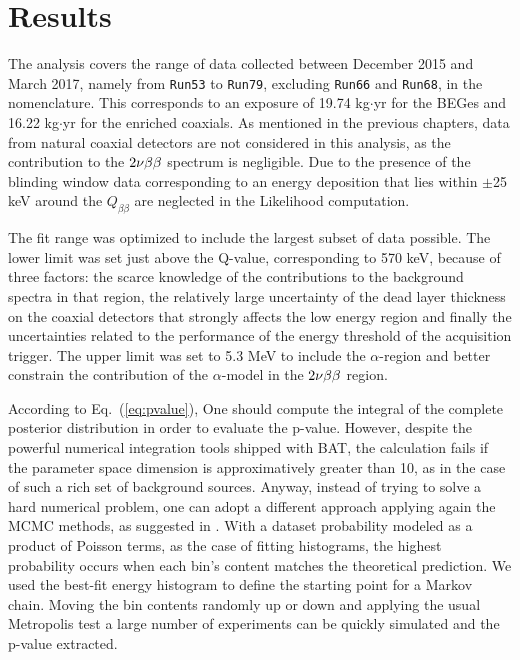 \section{Results}\label{sec:results}
The analysis covers the range of data collected between December 2015 and March 2017, namely from \texttt{Run53} to \texttt{Run79}, excluding \texttt{Run66} and \texttt{Run68}, in the {\gerda} nomenclature. This corresponds to an exposure of 19.74 kg$\cdot$yr for the BEGes and 16.22 kg$\cdot$yr for the enriched coaxials. As mentioned in the previous chapters, data from natural coaxial detectors are not considered in this analysis, as the contribution to the $2\nu\beta\beta$ spectrum is negligible. Due to the presence of the blinding window data corresponding to an energy deposition that lies within $\pm$25 keV around the $Q_{\beta\beta}$ are neglected in the Likelihood computation.

The fit range was optimized to include the largest subset of data possible. The lower limit was set just above the  Q-value, corresponding to 570 keV, because of three factors: the scarce knowledge of the contributions to the background spectra in that region, the relatively large uncertainty of the dead layer thickness on the coaxial detectors that strongly affects the low energy region and finally the uncertainties related to the performance of the energy threshold of the acquisition trigger. The upper limit was set to 5.3 MeV to include the $\alpha$-region and better constrain the contribution of the $\alpha$-model in the $2\nu\beta\beta$ region.

 According to Eq.~(\ref{eq:pvalue}), One should compute the integral of the complete posterior distribution in order to evaluate the p-value. However, despite the powerful numerical integration tools shipped with BAT, the calculation fails if the parameter space dimension is approximatively greater than 10, as in the case of such a rich set of background sources. Anyway, instead of trying to solve a hard numerical problem, one can adopt a different approach applying again the MCMC methods, as suggested in \cite{p-value}. With a dataset probability modeled as a product of Poisson terms, as the case of fitting histograms, the highest probability occurs when each bin's content matches the theoretical prediction. We used the best-fit energy histogram to define the starting point for a Markov chain. Moving the bin contents randomly up or down and applying the usual Metropolis test a large number of experiments can be quickly simulated and the p-value extracted.

